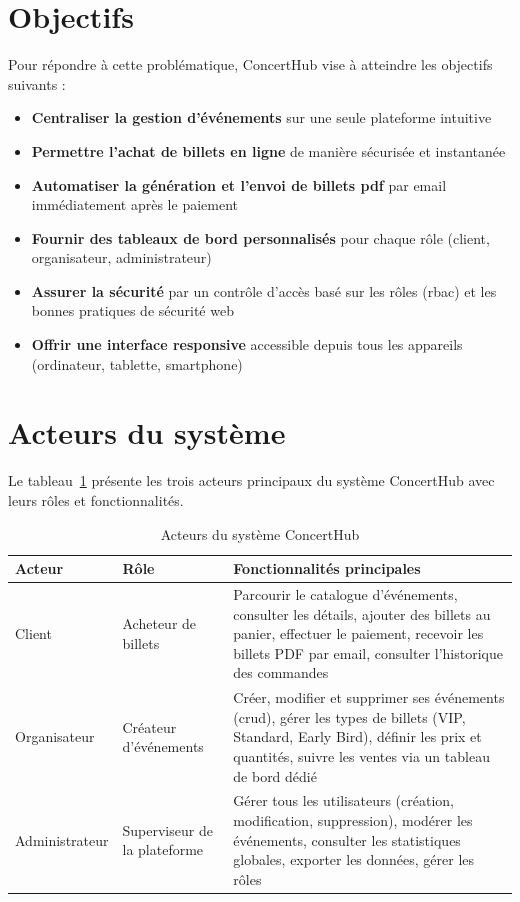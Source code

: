 \documentclass[a4paper,12pt,twoside]{report}
\begin{document}
\section{Objectifs}

Pour répondre à cette problématique, ConcertHub vise à atteindre les objectifs suivants :

\begin{itemize}
    \item \textbf{Centraliser la gestion d'événements} sur une seule plateforme intuitive
    \item \textbf{Permettre l'achat de billets en ligne} de manière sécurisée et instantanée
    \item \textbf{Automatiser la génération et l'envoi de billets \gls{pdf}} par email immédiatement après le paiement
    \item \textbf{Fournir des tableaux de bord personnalisés} pour chaque rôle (client, organisateur, administrateur)
    \item \textbf{Assurer la sécurité} par un contrôle d'accès basé sur les rôles (\gls{rbac}) et les bonnes pratiques de sécurité web
    \item \textbf{Offrir une interface responsive} accessible depuis tous les appareils (ordinateur, tablette, smartphone)
\end{itemize}

\section{Acteurs du système}

Le tableau~\ref{tab:acteurs} présente les trois acteurs principaux du système ConcertHub avec leurs rôles et fonctionnalités.

\begin{table}[!h]
    \renewcommand{\tablename}{Tableau}
    \centering
    \caption{Acteurs du système ConcertHub}
    \label{tab:acteurs}
    \smallskip
    \begin{tabular}{|p{2.5cm}|p{3.5cm}|p{7cm}|}
        \hline
        \textbf{Acteur} & \textbf{Rôle} & \textbf{Fonctionnalités principales} \\
        \hline \hline
        Client & Acheteur de billets & Parcourir le catalogue d'événements, consulter les détails, ajouter des billets au panier, effectuer le paiement, recevoir les billets PDF par email, consulter l'historique des commandes \\
        \hline
        Organisateur & Créateur d'événements & Créer, modifier et supprimer ses événements (\gls{crud}), gérer les types de billets (VIP, Standard, Early Bird), définir les prix et quantités, suivre les ventes via un tableau de bord dédié \\
        \hline
        Administrateur & Superviseur de la plateforme & Gérer tous les utilisateurs (création, modification, suppression), modérer les événements, consulter les statistiques globales, exporter les données, gérer les rôles \\
        \hline
    \end{tabular}
\end{table}
\end{document}
